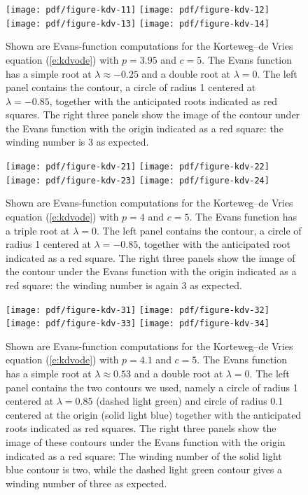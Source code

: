 \documentclass[10pt]{article}
\numberwithin{equation}{section}
\begin{document}
\begin{figure}
\centering 
\texttt{[image: pdf/figure-kdv-11]} 
\texttt{[image: pdf/figure-kdv-12]} 
\texttt{[image: pdf/figure-kdv-13]} 
\texttt{[image: pdf/figure-kdv-14]} 
\caption{Shown are Evans-function computations for the Korteweg--de Vries equation (\ref{e:kdvode}) with $p=3.95$ and $c=5$. The Evans function has a simple root at $\lambda\approx-0.25$ and a double root at $\lambda=0$. The left panel contains the contour, a circle of radius 1 centered at $\lambda=-0.85$, together with the anticipated roots indicated as red squares. The right three panels show the image of the contour under the Evans function with the origin indicated as a red square: the winding number is 3 as expected.}
\label{f:kdv1}
\end{figure}
	
\begin{figure}
\centering
\texttt{[image: pdf/figure-kdv-21]} 
\texttt{[image: pdf/figure-kdv-22]} 
\texttt{[image: pdf/figure-kdv-23]} 
\texttt{[image: pdf/figure-kdv-24]} 
\caption{Shown are Evans-function computations for the Korteweg--de Vries equation (\ref{e:kdvode}) with $p=4$ and $c=5$. The Evans function has a triple root at $\lambda=0$. The left panel contains the contour, a circle of radius 1 centered at $\lambda=-0.85$, together with the anticipated root indicated as a red square. The right three panels show the image of the contour under the Evans function with the origin indicated as a red square: the winding number is again 3 as expected.}
\label{f:kdv2}
\end{figure}

\begin{figure}
\centering
\texttt{[image: pdf/figure-kdv-31]} 
\texttt{[image: pdf/figure-kdv-32]} 
\texttt{[image: pdf/figure-kdv-33]} 
\texttt{[image: pdf/figure-kdv-34]} 
\caption{Shown are Evans-function computations for the Korteweg--de Vries equation (\ref{e:kdvode}) with $p=4.1$ and $c=5$. The Evans function has a simple root at $\lambda\approx0.53$ and a double root at $\lambda=0$. The left panel contains the two contours we used, namely a circle of radius 1 centered at $\lambda=0.85$ (dashed light green) and circle of radius 0.1 centered at the origin (solid light blue) together with the anticipated roots indicated as red squares. The right three panels show the image of these contours under the Evans function with the origin indicated as a red square: The winding number of the solid light blue contour is two, while the dashed light green contour gives a winding number of three as expected.}
\label{f:kdv3}
\end{figure}
\end{document}
